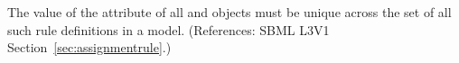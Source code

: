 The value of the attribute  of all \AssignmentRule and
\RateRule objects must be unique across the set of all such rule
definitions in a model.  (References: SBML L3V1
Section~\ref{sec:assignmentrule}.)
